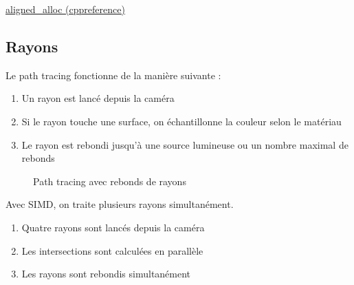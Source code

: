 \href{https://en.cppreference.com/w/c/memory/aligned_alloc}{aligned\_alloc (cppreference)}

\FloatBarrier

\subsection{Rayons}

Le path tracing fonctionne de la manière suivante :

\begin{enumerate}
\item Un rayon est lancé depuis la caméra
\item Si le rayon touche une surface, on échantillonne la couleur selon le matériau
\item Le rayon est rebondi jusqu'à une source lumineuse ou un nombre maximal de rebonds
\end{enumerate}

\begin{figure}[H]
\centering
{}
\caption{Path tracing avec rebonds de rayons}
\end{figure}

Avec SIMD, on traite plusieurs rayons simultanément.

\begin{enumerate}
\item Quatre rayons sont lancés depuis la caméra
\item Les intersections sont calculées en parallèle
\item Les rayons sont rebondis simultanément
\end{enumerate}

